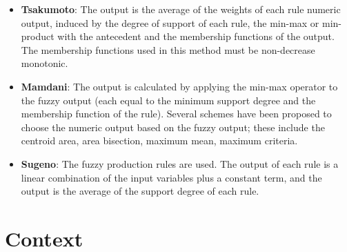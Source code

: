 \begin{itemize} 
\item \textbf{Tsakumoto}: The output is the average of the 
weights of each rule numeric output, induced by the degree of 
support of each rule, the min-max or min-product with the 
antecedent and the membership functions of the output. The 
membership functions used in this method must be 
non-decrease monotonic. 
\item \textbf{Mamdani}: The output is calculated by applying 
the min-max operator to the fuzzy output (each equal to the 
minimum support degree and the membership function of the rule). 
Several schemes have been proposed to choose the numeric output 
based on the fuzzy output; these include the centroid area, 
area bisection, maximum mean, maximum criteria.
\item \textbf{Sugeno}: The fuzzy production rules are used. The 
output of each rule is a linear combination of the input 
variables plus a constant term, and the output is the average 
of the support degree of each rule.
\end{itemize} 

\section{Context}

